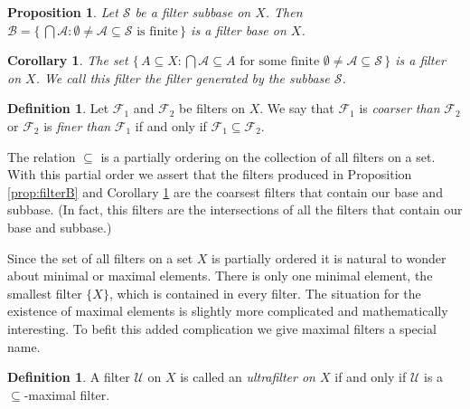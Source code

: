 \documentclass[12pt]{article}
\theoremstyle{plain}
\newtheorem{prop}[thm]{Proposition}
\newtheorem{cor}[thm]{Corollary}
\theoremstyle{definition}
\newtheorem{defn}[thm]{Definition}
\newcommand{\calA}{\mathcal{A}}
\newcommand{\calB}{\mathcal{B}}
\newcommand{\calF}{\mathcal{F}}
\newcommand{\calS}{\mathcal{S}}
\newcommand{\calU}{\mathcal{U}}
\begin{document}
\begin{prop}
  Let $\calS$ be a filter subbase on $X$.
  Then $\calB = \{\, \bigcap \calA : \mbox{$\emptyset \ne \calA
    \subseteq \calS$ is finite} \,\}$ is a filter base on $X$.
\end{prop}

\begin{cor}
  \label{cor:filterSB}
  The set $\{\, A \subseteq X : \mbox{$\bigcap\calA \subseteq A$ for
    some finite $\emptyset \ne \calA \subseteq \calS$} \,\}$ is a
  filter on $X$.
  We call this filter the \textsl{filter generated by the subbase $\calS$}.
\end{cor}

\begin{defn}
  Let $\calF_1$ and $\calF_2$ be filters on $X$.
  We say that $\calF_1$ is \textsl{coarser than} $\calF_2$ or
  $\calF_2$ is \textsl{finer than} $\calF_1$ if and only if $\calF_1
  \subseteq \calF_2$. 
\end{defn}

The relation $\subseteq$ is a partially ordering on the collection of
all filters on a set. 
With this partial order we assert that the filters produced in
Proposition \ref{prop:filterB} and Corollary \ref{cor:filterSB} are
the coarsest filters that contain our base and subbase. 
(In fact, this filters are the intersections of all the filters that
contain our base and subbase.)

Since the set of all filters on a set $X$ is partially ordered it is
natural to wonder about minimal or maximal elements.  
There is only one minimal element, the smallest filter $\{X\}$, which
is contained in every filter.
The situation for the existence of maximal elements is slightly more
complicated and mathematically interesting.
To befit this added complication we give maximal filters a special
name.

\begin{defn}
  A filter $\calU$ on $X$ is called an \textsl{ultrafilter on $X$} if and
  only if $\calU$ is a \mbox{$\subseteq$-maximal} filter.
\end{defn}
\end{document}

